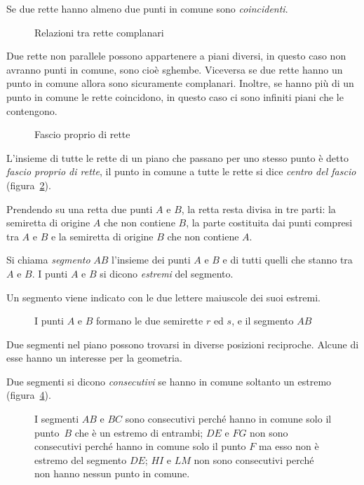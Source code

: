 \begin{definizione}
Se due rette hanno almeno due punti in comune sono \emph{coincidenti}.
\end{definizione}

\begin{figure}[hbt]
 \centering 
 \caption{Relazioni tra rette complanari}\label{fig:1.12}
\end{figure}

\osservazione Due rette non parallele possono appartenere a piani diversi, in questo caso non avranno punti in comune, sono cioè sghembe. Viceversa se due rette hanno un punto in comune allora sono sicuramente complanari. Inoltre, se hanno più di un punto in comune le rette coincidono, in questo caso ci sono infiniti piani che le contengono. 

\begin{figure}[!htb]
	\centering
	\caption{Fascio proprio di rette}\label{fig:1.16}
\end{figure}

\begin{definizione}
L'insieme di tutte le rette di un piano che passano per uno stesso punto è detto \emph{fascio proprio di rette}, il punto in comune a tutte le rette si dice \emph{centro del fascio} (figura~\ref{fig:1.16}).
\end{definizione}

Prendendo su una retta due punti $A$ e $B$, la retta resta divisa in tre parti: la semiretta di origine $A$ che non contiene $B$, la parte costituita dai punti compresi tra $A$ e $B$ e la semiretta di origine $B$ che non contiene $A$.

\begin{definizione}
Si chiama \emph{segmento} $AB$ l'insieme dei punti $A$ e $B$ e di tutti quelli che stanno tra $A$ e $B$.
I punti $A$ e $B$ si dicono \emph{estremi} del segmento.
\end{definizione}
Un segmento viene indicato con le due lettere maiuscole dei suoi estremi.
\begin{figure}[bth]
 \centering 
 \caption{I punti $A$ e $B$ formano le due semirette $r$ ed $s$, e il segmento $AB$}\label{fig:1.13}
\end{figure}

Due segmenti nel piano possono trovarsi in diverse posizioni reciproche. Alcune di esse hanno un interesse per la geometria.
\begin{definizione}
Due segmenti si dicono \emph{consecutivi} se hanno in comune soltanto un estremo (figura~\ref{fig:1.14}).
\end{definizione}
\begin{figure}[bth]
 \centering 
 \caption{I segmenti $AB$ e $BC$ sono consecutivi perché hanno in comune solo il punto~$B$ che è un estremo di entrambi; $DE$ e $FG$ non sono consecutivi perché hanno in comune solo il punto $F$ ma esso non è estremo del segmento $DE$; $HI$ e $LM$ non sono consecutivi perché non hanno nessun punto in comune.}\label{fig:1.14}
\end{figure}


